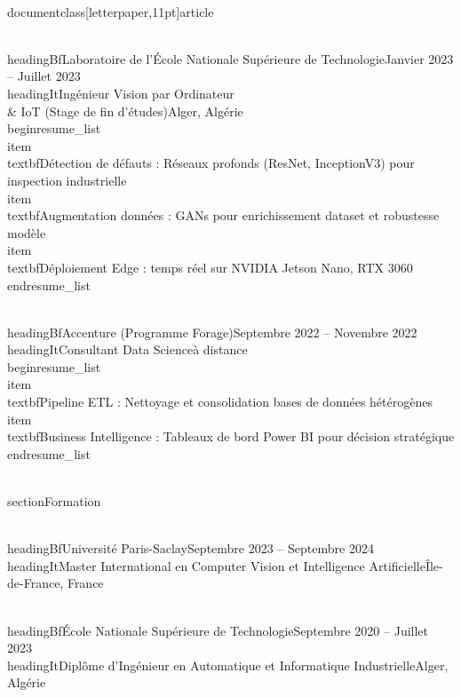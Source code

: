 \\documentclass[letterpaper,11pt]{article}
\begin{document}
\\headingBf{Laboratoire de l'École Nationale Supérieure de Technologie}{Janvier 2023 -- Juillet 2023}
\\headingIt{Ingénieur Vision par Ordinateur \\& IoT (Stage de fin d'études)}{Alger, Algérie}
\\begin{resume_list}
  \\item \\textbf{Détection de défauts :} Réseaux profonds (ResNet, InceptionV3) pour inspection industrielle
  \\item \\textbf{Augmentation données :} GANs pour enrichissement dataset et robustesse modèle
  \\item \\textbf{Déploiement Edge :} temps réel sur NVIDIA Jetson Nano, RTX 3060
\\end{resume_list}

\\headingBf{Accenture (Programme Forage)}{Septembre 2022 -- Novembre 2022}
\\headingIt{Consultant Data Science}{à distance}
\\begin{resume_list}
  \\item \\textbf{Pipeline ETL :} Nettoyage et consolidation bases de données hétérogènes
  \\item \\textbf{Business Intelligence :} Tableaux de bord Power BI pour décision stratégique
\\end{resume_list}

\\section{Formation}

\\headingBf{Université Paris-Saclay}{Septembre 2023 -- Septembre 2024}
\\headingIt{Master International en Computer Vision et Intelligence Artificielle}{Île-de-France, France}

\\headingBf{École Nationale Supérieure de Technologie}{Septembre 2020 -- Juillet 2023}
\\headingIt{Diplôme d'Ingénieur en Automatique et Informatique Industrielle}{Alger, Algérie}
\end{document}
